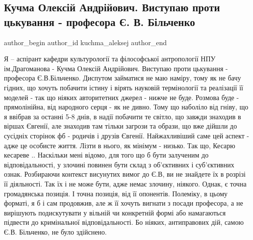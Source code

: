  
 
 
 
 
 
\subsection{Кучма Олексій Андрійович. Виступаю проти цькування - професора Є. В. Більченко}
\label{sec:28_01_2021.fb.kuchma_aleksej.1.bilchenko_evgenia_travlja}
\ifcmt
 author_begin
   author_id kuchma_aleksej
 author_end
\fi

Я – аспірант кафедри культурології та філософської антропології НПУ
ім.Драгоманова - Кучма Олексій Андрійович. Виступаю проти цькування - професора
Є.В.Більченко. Диспутом займатися не маю наміру, тому як не бачу гідних, що
хочуть побачити істину і вірять науковій термінології  та реалізації її моделей
- так що ніяких авторитетних джерел - нижче не буде. Розмова буде -
прямолінійна, від народного серця - як не дивно. Тому що наболіло від гніву, що
я ввібрав за останні 5-8 днів, в надії побачити те світло, що завжди знаходив в
віршах Євгенії, але знаходив там тільки загрози та образи, що вже дійшли до
сусідніх сторінок фб - родичів і друзів Євгенії. Найжахливіший саме цей аспект
- адже це особисте життя. Лізти в нього, як мінімум - низько. Так що, Кесарю
кесареве .. Наскільки мені відомо, для того що б бути залученим до
відповідальності, у злочині повинен бути склад з об'єктивних і суб'єктивних
ознак. Розбираючи контекст висунутих вимог до Є.В, ви не знайдете їх в розрізі
її діяльності. Так їх і не може бути, адже немає злочину, ніякого. Однак, є
точна громадянська позиція. І точна позиція, від її опонентів. Полеміку, в
цьому форматі, я б і сам продовжив, але ж її хочуть вигнати з посади професора,
а не вирішують подискутувати у вільній чи конкретній формі або намагаються
підвести до кримінальної відповідальності. Бо ніяких, антиправових дій, самою
Є.В. Більченко, не було здійснено.

